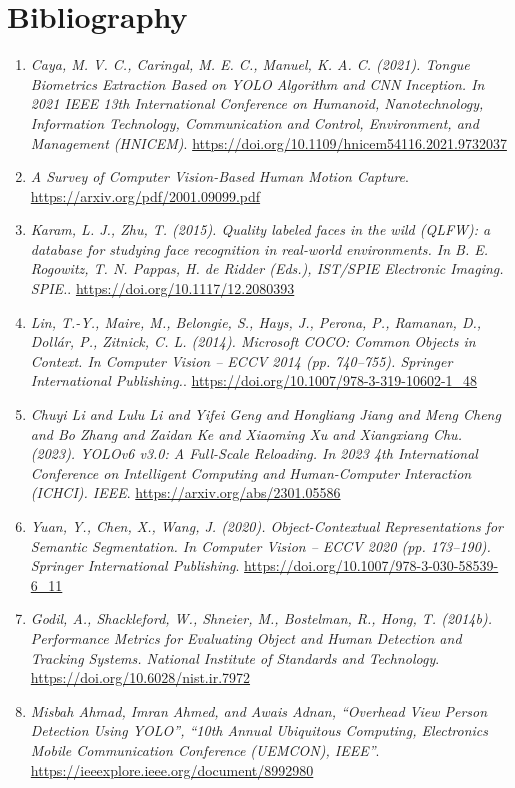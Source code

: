 \section{Bibliography}
\label{sec:bibliography}
\begin{enumerate}
    \item \label{bib:1} \textit{Caya, M. V. C., Caringal, M. E. C.,  Manuel, K. A. C. (2021). Tongue Biometrics Extraction Based on YOLO Algorithm and CNN Inception. In 2021 IEEE 13th International Conference on Humanoid, Nanotechnology, Information Technology, Communication and Control, Environment, and Management (HNICEM)}. \url{https://doi.org/10.1109/hnicem54116.2021.9732037}    \item \label{bib:2} \textit{A Survey of Computer Vision-Based Human Motion Capture}. \url{https://arxiv.org/pdf/2001.09099.pdf}
    \item \label{bib:2} \textit{Karam, L. J.,  Zhu, T. (2015). Quality labeled faces in the wild (QLFW): a database for studying face recognition in real-world environments. In B. E. Rogowitz, T. N. Pappas,  H. de Ridder (Eds.), IST/SPIE Electronic Imaging. SPIE.}. \url{https://doi.org/10.1117/12.2080393}
    \item \label{bib:3} \textit{Lin, T.-Y., Maire, M., Belongie, S., Hays, J., Perona, P., Ramanan, D., Dollár, P.,  Zitnick, C. L. (2014). Microsoft COCO: Common Objects in Context. In Computer Vision – ECCV 2014 (pp. 740–755). Springer International Publishing.}. \url{https://doi.org/10.1007/978-3-319-10602-1_48}
    \item \label{bib:4} \textit{Chuyi Li and Lulu Li and Yifei Geng and Hongliang Jiang and Meng Cheng and Bo Zhang and Zaidan Ke and Xiaoming Xu and Xiangxiang Chu. (2023). YOLOv6 v3.0: A Full-Scale Reloading. In 2023 4th International Conference on Intelligent Computing and Human-Computer Interaction (ICHCI). IEEE}. \url{https://arxiv.org/abs/2301.05586}
    \item \label{bib:5} \textit{Yuan, Y., Chen, X.,  Wang, J. (2020). Object-Contextual Representations for Semantic Segmentation. In Computer Vision – ECCV 2020 (pp. 173–190). Springer International Publishing}. \url{https://doi.org/10.1007/978-3-030-58539-6_11}
    \item \label{bib:6} \textit{Godil, A., Shackleford, W., Shneier, M., Bostelman, R.,  Hong, T. (2014b). Performance Metrics for Evaluating Object and Human Detection and Tracking Systems. National Institute of Standards and Technology}. \url{https://doi.org/10.6028/nist.ir.7972}
    \item \label{bib:7} \textit{Misbah Ahmad, Imran Ahmed, and Awais Adnan, “Overhead View Person Detection Using YOLO”, “10th Annual Ubiquitous Computing, Electronics  Mobile Communication Conference (UEMCON), IEEE”}. \url{https://ieeexplore.ieee.org/document/8992980}
\end{enumerate}

